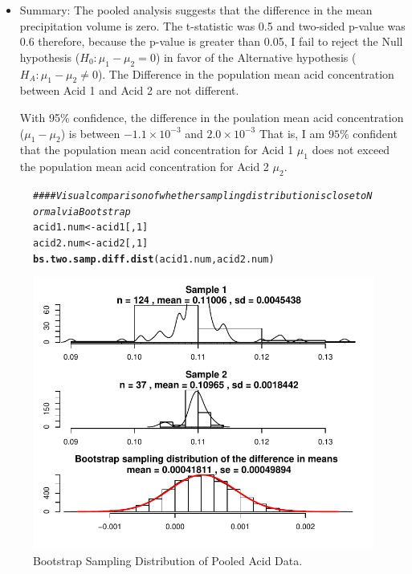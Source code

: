 \documentclass{article}\usepackage[]{graphicx}\usepackage[]{color}
\makeatletter
\def\maxwidth{ %
  \ifdim\Gin@nat@width>\linewidth
    \linewidth
  \else
    \Gin@nat@width
  \fi
}
\newcommand{\hlnum}[1]{\textcolor[rgb]{0.686,0.059,0.569}{#1}}%
\newcommand{\hlcom}[1]{\textcolor[rgb]{0.678,0.584,0.686}{\textit{#1}}}%
\newcommand{\hlstd}[1]{\textcolor[rgb]{0.345,0.345,0.345}{#1}}%
\newcommand{\hlkwb}[1]{\textcolor[rgb]{0.69,0.353,0.396}{#1}}%
\newcommand{\hlkwd}[1]{\textcolor[rgb]{0.737,0.353,0.396}{\textbf{#1}}}%
\newenvironment{kframe}{%
 \def\at@end@of@kframe{}%
 \ifinner\ifhmode%
  \def\at@end@of@kframe{\end{minipage}}%
  \begin{minipage}{\columnwidth}%
 \fi\fi%
 \def\FrameCommand##1{\hskip\@totalleftmargin \hskip-\fboxsep
 \colorbox{shadecolor}{##1}\hskip-\fboxsep
     \hskip-\linewidth \hskip-\@totalleftmargin \hskip\columnwidth}%
 \MakeFramed {\advance\hsize-\width
   \@totalleftmargin\z@ \linewidth\hsize
   \@setminipage}}%
 {\par\unskip\endMakeFramed%
 \at@end@of@kframe}
\newenvironment{knitrout}{}{} %
\makeatother
\begin{document}
\begin{itemize}
\item  Summary:  The pooled analysis suggests that the difference in the mean precipitation volume is  zero.  The t-statistic was 0.5 and two-sided p-value was 0.6 therefore, because the p-value is greater than 0.05, I fail to reject the Null hypothesis ($H_0: \mu_1 - \mu_2 = 0$) in favor of the Alternative hypothesis ($H_A: \mu_1 - \mu_2 \ne 0$).  The Difference in the population mean acid concentration between Acid 1 and Acid 2 are not different.  \

With 95\% confidence, the difference in the poulation mean acid concentration ($\mu_1 - \mu_2$) is between $-1.1 \times 10 ^{-3}$ and $2.0 \times 10^{-3}$  That is, I am $95\%$ confident that the population mean acid concentration for Acid 1 $\mu_1$ does not exceed the population mean acid concentration for Acid 2 $\mu_2$.

\end{itemize}

\begin{figure}[H]  \begin{center}
\begin{knitrout}
\color{fgcolor}\begin{kframe}
\begin{alltt}
\hlcom{#### Visual comparison of whether sampling distribution is close to Normal via Bootstrap}
\hlstd{acid1.num} \hlkwb{<-} \hlstd{acid1[,}\hlnum{1}\hlstd{]}
\hlstd{acid2.num} \hlkwb{<-} \hlstd{acid2[,}\hlnum{1}\hlstd{]}
\hlkwd{bs.two.samp.diff.dist}\hlstd{(acid1.num, acid2.num)}
\end{alltt}
\end{kframe}
\includegraphics[width=\maxwidth]{figure/2b_bootstrap} 

\end{knitrout}
\end{center} \caption{Bootstrap Sampling Distribution of Pooled Acid Data.} \end{figure}
\end{document}
